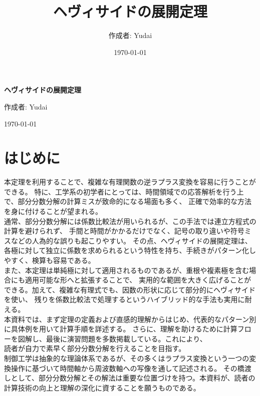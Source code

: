 \documentclass[a4paper,12pt]{report}
\title{ヘヴィサイドの展開定理}
\author{作成者: Yudai }
\date{\today}
\begin{document}
\begin{titlepage}
    \centering
    \vspace*{5cm}
    {\Huge\bfseries ヘヴィサイドの展開定理\par}
    \vspace{2cm}
    {\Large 作成者: Yudai \par}
    \vfill
    {\Large \today\par}
\end{titlepage}

\tableofcontents
\newpage

\chapter{はじめに}

\indent

本定理を利用することで、複雑な有理関数の逆ラプラス変換を容易に行うことができる。
特に、工学系の初学者にとっては、時間領域での応答解析を行う上で、部分分数分解の計算ミスが致命的になる場面も多く、
正確で効率的な方法を身に付けることが望まれる。\\

通常、部分分数分解には係数比較法が用いられるが、この手法では連立方程式の計算を避けられず、
手間と時間がかかるだけでなく、記号の取り違いや符号ミスなどの人為的な誤りも起こりやすい。
その点、ヘヴィサイドの展開定理は、各極に対して独立に係数を求められるという特性を持ち、手続きがパターン化しやすく、検算も容易である。\\

また、本定理は単純極に対して適用されるものであるが、重根や複素極を含む場合にも適用可能な形へと拡張することで、
実用的な範囲を大きく広げることができる。加えて、複雑な有理式でも、因数の形状に応じて部分的にヘヴィサイドを使い、
残りを係数比較法で処理するというハイブリッド的な手法も実用に耐える。\\

本資料では、まず定理の定義および直感的理解からはじめ、代表的なパターン別に具体例を用いて計算手順を詳述する。
さらに、理解を助けるために計算フローを図解し、最後に演習問題を多数掲載している。これにより、\\
読者が自力で素早く部分分数分解を行えることを目指す。\\

制御工学は抽象的な理論体系であるが、その多くはラプラス変換という一つの変換操作に基づいて時間軸から周波数軸への写像を通して記述される。
その橋渡しとして、部分分数分解とその解法は重要な位置づけを持つ。本資料が、読者の計算技術の向上と理解の深化に資することを願うものである。\\
\end{document}
